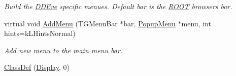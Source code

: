 \begin{DoxyCompactItemize}
\begin{DoxyCompactList}\small\item\em Build the \hyperlink{struct_d_d4hep_1_1_d_d_eve}{D\+D\+Eve} specific menues. Default bar is the \hyperlink{namespace_r_o_o_t}{R\+O\+OT} browser\textquotesingle{}s bar. \end{DoxyCompactList}\item 
virtual void \hyperlink{class_d_d4hep_1_1_display_ac2ef8ca2957cd39ad268c7536edb6757}{Add\+Menu} (T\+G\+Menu\+Bar $\ast$bar, \hyperlink{class_d_d4hep_1_1_popup_menu}{Popup\+Menu} $\ast$menu, int hints=k\+L\+Hints\+Normal)
\begin{DoxyCompactList}\small\item\em Add new menu to the main menu bar. \end{DoxyCompactList}\item 
\hyperlink{class_d_d4hep_1_1_display_a400873f854d08d19a22939eab0bc5b5a}{Class\+Def} (\hyperlink{class_d_d4hep_1_1_display}{Display}, 0)
\end{DoxyCompactItemize}
